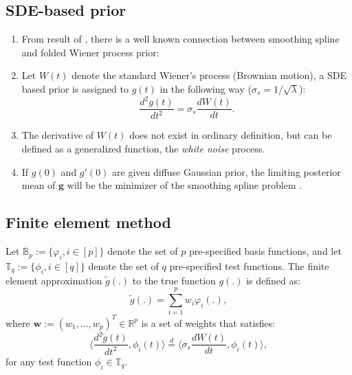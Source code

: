 \documentclass{beamer} %
\begin{document}
\subsection{SDE-based prior}
\begin{frame}

\begin{enumerate}

\item From result of \cite{wahba}, there is a well known connection between smoothing spline and folded Wiener process prior:
\pause

\item Let $W(t)$ denote the standard Wiener's process (Brownian motion), a SDE based prior is assigned to $g(t)$ in the following way ($\sigma_s = 1/\sqrt{\lambda}$):
$$\frac{d^2g(t)}{dt^2} = \sigma_s\frac{dW(t)}{dt}.$$ 
\pause


\item The derivative of $W(t)$ does not exist in ordinary definition, but can be defined as a generalized function, the \textit{white noise} process. 

\pause


\item If $g(0)$ and $g'(0)$ are given diffuse Gaussian prior, the limiting posterior mean of $\boldsymbol g$ will be the minimizer of the smoothing spline problem \citep{wahba}.

\end{enumerate}

\end{frame}
\subsection{Finite element method}
\begin{frame}

\begin{definition}
Let $\mathbb{B}_p:=\{\varphi_i, i \in [p] \}$ denote the set of $p$ pre-specified basis functions, and let $\mathbb{T}_q:=\{\phi_i, i \in [q]\}$ denote the set of $q$ pre-specified test functions. The finite element approximation $\tilde{g}(.)$ to the true function $g(.)$ is defined as:
\pause
\begin{equation}\label{discretization}
\tilde{g}(.) = \sum_{i=1}^{p}w_i \varphi_i(.),
\end{equation}
\pause
where $\boldsymbol{w} := (w_1,...,w_p)^T \in \mathbb{R}^p$ is a set of weights that satisfies:
\pause
\begin{equation}\label{weakSol}
\langle \frac{d^2\tilde{g}(t)}{dt^2} , \phi_i(t)\rangle \overset{d}= \langle \sigma_s\frac{dW(t)}{dt} , \phi_i(t)\rangle,
\end{equation}
for any test function $\phi_i \in \mathbb{T}_q$.
\end{definition}

\end{frame}
\end{document}
